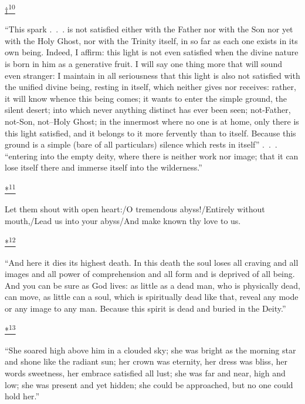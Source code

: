 \protect\hypertarget{23_NOTES.xhtmlux5cux23id_2598}{\protect\hyperlink{17_Chapter_Ten__THE_FAILURE_OF_IMAG.xhtmlux5cux23id_2597}{†\textsuperscript{10}}}
``This spark .~.~. is not satisfied either with the Father nor with the
Son nor yet with the Holy Ghost, nor with the Trinity itself, in so far
as each one exists in its own being. Indeed, I affirm: this light is not
even satisfied when the divine nature is born in him as a generative
fruit. I will say one thing more that will sound even stranger: I
maintain in all seriousness that this light is also not satisfied with
the unified divine being, resting in itself, which neither gives nor
receives: rather, it will know whence this being comes; it wants to
enter the simple ground, the silent desert; into which never anything
distinct has ever been seen; not-Father, not-Son, not--Holy Ghost; in
the innermost where no one is at home, only there is this light
satisfied, and it belongs to it more fervently than to itself. Because
this ground is a simple (bare of all particulars) silence which rests in
itself'' .~.~. ``entering into the empty deity, where there is neither
work nor image; that it can lose itself there and immerse itself into
the wilderness.''

\protect\hypertarget{23_NOTES.xhtmlux5cux23id_2600}{\protect\hyperlink{17_Chapter_Ten__THE_FAILURE_OF_IMAG.xhtmlux5cux23id_2599}{*\textsuperscript{11}}}
Let them shout with open heart:/O tremendous abyss!/Entirely without
mouth,/Lead us into your abyss/And make known thy love to us.

\protect\hypertarget{23_NOTES.xhtmlux5cux23id_2602}{\protect\hyperlink{17_Chapter_Ten__THE_FAILURE_OF_IMAG.xhtmlux5cux23id_2601}{*\textsuperscript{12}}}
``And here it dies its highest death. In this death the soul loses all
craving and all images and all power of comprehension and all form and
is deprived of all being. And you can be sure as God lives: as little as
a dead man, who is physically dead, can move, as little can a soul,
which is spiritually dead like that, reveal any mode or any image to any
man. Because this spirit is dead and buried in the Deity.''

\protect\hypertarget{23_NOTES.xhtmlux5cux23id_2604}{\protect\hyperlink{17_Chapter_Ten__THE_FAILURE_OF_IMAG.xhtmlux5cux23id_2603}{*\textsuperscript{13}}}
``She soared high above him in a clouded sky; she was bright as the
morning star and shone like the radiant sun; her crown was eternity, her
dress was bliss, her words sweetness, her embrace satisfied all lust;
she was far and near, high and low; she was present and yet hidden; she
could be approached, but no one could hold her.''

